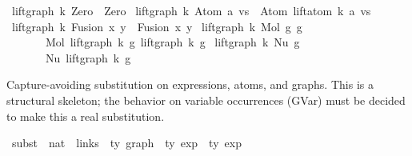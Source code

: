 \begin{isabellebody}
{\isacharbar}{\kern0pt}\ {\isachardoublequoteopen}lift{\isacharunderscore}{\kern0pt}graph\ k\ Zero\ {\isacharequal}{\kern0pt}\ Zero{\isachardoublequoteclose}\isanewline
{\isacharbar}{\kern0pt}\ {\isachardoublequoteopen}lift{\isacharunderscore}{\kern0pt}graph\ k\ {\isacharparenleft}{\kern0pt}Atom\ a\ vs{\isacharparenright}{\kern0pt}\ {\isacharequal}{\kern0pt}\ Atom\ {\isacharparenleft}{\kern0pt}lift{\isacharunderscore}{\kern0pt}atom\ k\ a{\isacharparenright}{\kern0pt}\ vs{\isachardoublequoteclose}\isanewline
{\isacharbar}{\kern0pt}\ {\isachardoublequoteopen}lift{\isacharunderscore}{\kern0pt}graph\ k\ {\isacharparenleft}{\kern0pt}Fusion\ x\ y{\isacharparenright}{\kern0pt}\ {\isacharequal}{\kern0pt}\ Fusion\ x\ y{\isachardoublequoteclose}\isanewline
{\isacharbar}{\kern0pt}\ {\isachardoublequoteopen}lift{\isacharunderscore}{\kern0pt}graph\ k\ {\isacharparenleft}{\kern0pt}Mol\ g{}\ g{}{\isacharparenright}{\kern0pt}\ {\isacharequal}{\kern0pt}\isanewline
\ \ \ \ \ \ \ Mol\ {\isacharparenleft}{\kern0pt}lift{\isacharunderscore}{\kern0pt}graph\ k\ g{}{\isacharparenright}{\kern0pt}\ {\isacharparenleft}{\kern0pt}lift{\isacharunderscore}{\kern0pt}graph\ k\ g{}{\isacharparenright}{\kern0pt}{\isachardoublequoteclose}\isanewline
{\isacharbar}{\kern0pt}\ {\isachardoublequoteopen}lift{\isacharunderscore}{\kern0pt}graph\ k\ {\isacharparenleft}{\kern0pt}Nu\ g{\isacharparenright}{\kern0pt}\ {\isacharequal}{\kern0pt}\isanewline
\ \ \ \ \ \ \ Nu\ {\isacharparenleft}{\kern0pt}lift{\isacharunderscore}{\kern0pt}graph\ k\ g{\isacharparenright}{\kern0pt}{\isachardoublequoteclose}%
\begin{isamarkuptext}%
Capture-avoiding substitution  on expressions, atoms, and graphs.
  This is a structural skeleton; the behavior on variable occurrences (GVar)
  must be decided to make this a real substitution.%
\end{isamarkuptext}\isamarkuptrue%
\isamarkupfalse%
\ subst\ {\isacharcolon}{\kern0pt}{\isacharcolon}{\kern0pt}\ {\isachardoublequoteopen}nat\ {\isacharequal}{\kern0pt}{\isachargreater}{\kern0pt}\ links\ {\isacharequal}{\kern0pt}{\isachargreater}{\kern0pt}\ {\isacharprime}{\kern0pt}ty\ graph\ {\isacharequal}{\kern0pt}{\isachargreater}{\kern0pt}\ {\isacharprime}{\kern0pt}ty\ exp\ {\isacharequal}{\kern0pt}{\isachargreater}{\kern0pt}\ {\isacharprime}{\kern0pt}ty\ exp{\isachardoublequoteclose}\isanewline

\end{isabellebody}

